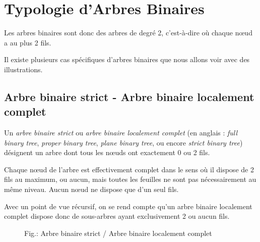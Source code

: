 \documentclass[11pt,a4paper]{article}
\begin{document}
\clearpage

\section{Typologie d'Arbres Binaires}

\bigskip

Les arbres binaires sont donc des arbres de degré 2, c'est-à-dire où chaque nœud a au plus 2 fils.

Il existe plusieurs cas spécifiques d'arbres binaires que nous allons voir avec des illustrations.


\medskip


\subsection{Arbre binaire strict - Arbre binaire localement complet}

Un \textit{arbre binaire strict} ou \textit{arbre binaire localement complet} (en anglais : \textit{full binary tree}, \textit{proper binary tree}, \textit{plane binary tree}, ou encore \textit{strict binary tree}) désignent un arbre dont tous les nœuds ont exactement 0 ou 2 fils.

Chaque nœud de l'arbre est effectivement complet dans le sens où il dispose de 2 fils au maximum, ou aucun, mais toutes les feuilles ne sont pas nécessairement au même niveau.
Aucun nœud ne dispose que d'un seul fils.

Avec un point de vue récursif, on se rend compte qu'un arbre binaire localement complet dispose donc de sous-arbres ayant exclusivement 2 ou aucun fils.

\begin{figure}[ht!]
\caption{Fig.\thefigure : Arbre binaire strict / Arbre binaire localement complet}
\label{fig:example2-full-binary-tree}
\end{figure}
\end{document}
